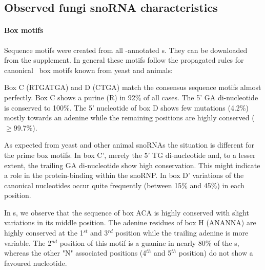 \subsection{Observed fungi snoRNA characteristics}

\paragraph{\textbf{Box motifs}} Sequence motifs were created from all \snostrip-annotated \sno s. They can be downloaded from the supplement.
In general these motifs follow the propagated rules for canonical \sno\ box motifs known from yeast and animals: 

Box C (RTGATGA) and D (CTGA)  match the consensus sequence motifs
almost perfectly. Box C shows a purine (R) in 92\% of all cases. 
The 5' GA di-nucleotide is conserved to 100\%. 
The 5' nucleotide  of box D
shows few mutations (4.2\%) mostly towards an adenine while the
remaining positions are highly conserved ($\ge$99.7\%). 

As expected from yeast and other animal snoRNAs the situation is different for the prime box motifs. 
In box C', merely the 5' TG  di-nucleotide and, to a lesser extent, the
trailing GA di-nucleotide show high conservation. 
This might indicate a role in the protein-binding within the snoRNP. 
In box D' variations of the canonical nucleotides occur quite
frequently (between 15\% and 45\%) in each position.

In \haca s, we observe that the sequence of box ACA is highly conserved with
slight variations in its middle position. The adenine residues of box H (ANANNA) are highly conserved at the 1$^{st}$ and
3$^{rd}$ position while the trailing  adenine is more variable. The
2$^{nd}$ position of this motif is a guanine in nearly 80\% of the \haca s, whereas the other "N" associated positions (4$^{th}$ and 5$^{th}$ position) do not show a favoured nucleotide.

